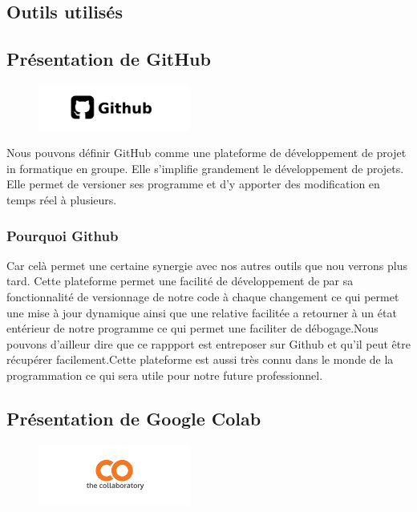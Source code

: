 \subsection{Outils utilisés}

\subsection{Présentation de GitHub}

\begin{figure}[h]
  \begin{center}
  \includegraphics[width=5cm]{./images/github.jpg}
  \end{center}
\end{figure}

Nous pouvons définir GitHub comme une plateforme de développement de projet in formatique en groupe. Elle s'implifie grandement le développement de projets. Elle permet de versioner ses programme et d'y apporter des modification en temps réel à plusieurs.

\subsubsection{Pourquoi Github}
Car celà permet une certaine synergie avec nos autres outils que nou verrons plus tard. Cette plateforme permet une facilité de développement de par sa fonctionnalité de versionnage de notre code à chaque changement ce qui permet une mise à jour dynamique ainsi que une relative facilitée a retourner à un état entérieur de notre programme ce qui permet une faciliter de débogage.Nous pouvons d'ailleur dire que ce rappport est entreposer sur Github et qu'il peut être récupérer facilement.Cette plateforme est aussi très connu dans le monde de la programmation ce qui sera utile pour notre future professionnel.

\subsection{Présentation de Google Colab}

\begin{figure}[h]
\begin{center}
\includegraphics[width=5cm]{./images/Colab_logo.png}
\end{center}
\end{figure}

